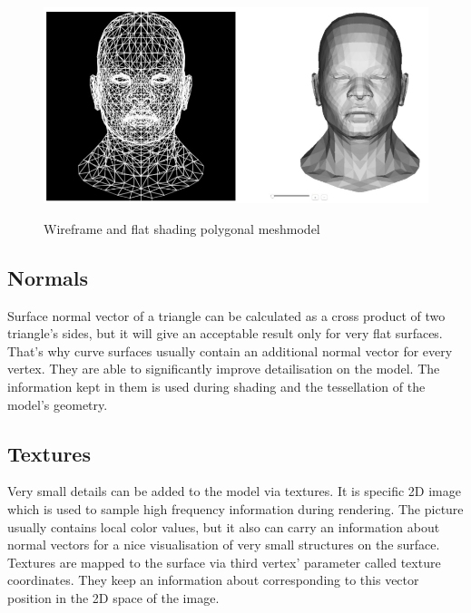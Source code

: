 \documentclass[twoside, english, 11pt]{report}
\begin{document}
\begin{figure}[!h]
\includegraphics[scale=0.55]{img/mesh}\\
\caption{Wireframe and flat shading polygonal meshmodel}
\end{figure}

\subsection{Normals}
Surface normal vector of a triangle can be calculated as a cross product of two triangle's sides, but it will give an acceptable result only for very flat surfaces. That's why curve surfaces usually contain an additional normal vector for every vertex. They are able to significantly improve detailisation on the model. The information kept in them is used during shading and the tessellation of the model's geometry.\\


\subsection{Textures}
Very small details can be added to the model via textures. It is specific 2D image which is used to sample high frequency information during rendering. The picture usually contains local color values, but it also can carry an information about normal vectors for a nice visualisation of very small structures on the surface. Textures are mapped to the surface via third vertex' parameter called texture coordinates. They keep an information about corresponding to this vector position in the 2D space of the image.\\

\end{document}
